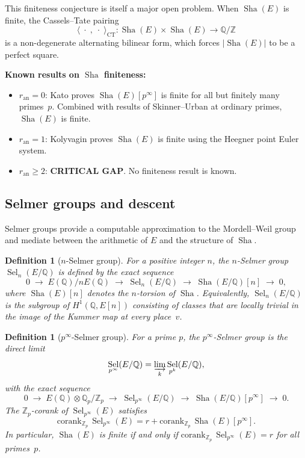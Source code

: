 \documentclass[11pt]{article}
\newtheorem{definition}[theorem]{Definition}
\DeclareMathOperator{\Sha}{Sha}
\DeclareMathOperator{\Sel}{Sel}
\begin{document}
\noindent
This finiteness conjecture is itself a major open problem.  When $\Sha(E)$ is
finite, the Cassels--Tate pairing \cite{Cassels}
\[
  \langle\;\cdot\;,\;\cdot\;\rangle_{\mathrm{CT}} :
  \Sha(E) \times \Sha(E) \longrightarrow \mathbb{Q}/\mathbb{Z}
\]
is a non-degenerate alternating bilinear form, which forces $|\Sha(E)|$ to be
a perfect square.

\textbf{Known results on $\Sha$ finiteness:}
\begin{itemize}
  \item $r_{\mathrm{an}} = 0$: Kato \cite{Kato} proves $\Sha(E)[p^\infty]$ is
    finite for all but finitely many primes~$p$.  Combined with results of
    Skinner--Urban \cite{SU} at ordinary primes, $\Sha(E)$ is finite.
  \item $r_{\mathrm{an}} = 1$: Kolyvagin \cite{Koly} proves $\Sha(E)$ is
    finite using the Heegner point Euler system.
  \item $r_{\mathrm{an}} \geq 2$: \textbf{CRITICAL GAP}.  No finiteness
    result is known.
\end{itemize}

\subsection{Selmer groups and descent}
\label{subsec:selmer}

Selmer groups provide a computable approximation to the Mordell--Weil group and
mediate between the arithmetic of $E$ and the structure of $\Sha$.

\begin{definition}[$n$-Selmer group]
For a positive integer $n$, the \emph{$n$-Selmer group} $\Sel_n(E/\mathbb{Q})$
is defined by the exact sequence
\[
  0 \;\longrightarrow\; E(\mathbb{Q})/nE(\mathbb{Q})
  \;\longrightarrow\; \Sel_n(E/\mathbb{Q})
  \;\longrightarrow\; \Sha(E/\mathbb{Q})[n]
  \;\longrightarrow\; 0,
\]
where $\Sha(E)[n]$ denotes the $n$-torsion of $\Sha$.  Equivalently,
$\Sel_n(E/\mathbb{Q})$ is the subgroup of $H^1(\mathbb{Q}, E[n])$ consisting
of classes that are locally trivial in the image of the Kummer map at every
place~$v$.
\end{definition}

\begin{definition}[$p^\infty$-Selmer group]
For a prime $p$, the \emph{$p^\infty$-Selmer group} is the direct limit
\[
  \Sel_{p^\infty}(E/\mathbb{Q}) = \varinjlim_k \Sel_{p^k}(E/\mathbb{Q}),
\]
with the exact sequence
\[
  0 \;\longrightarrow\; E(\mathbb{Q}) \otimes \mathbb{Q}_p/\mathbb{Z}_p
  \;\longrightarrow\; \Sel_{p^\infty}(E/\mathbb{Q})
  \;\longrightarrow\; \Sha(E/\mathbb{Q})[p^\infty]
  \;\longrightarrow\; 0.
\]
The $\mathbb{Z}_p$-corank of $\Sel_{p^\infty}(E)$ satisfies
\[
  \mathrm{corank}_{\mathbb{Z}_p}\, \Sel_{p^\infty}(E) = r + \mathrm{corank}_{\mathbb{Z}_p}\, \Sha(E)[p^\infty].
\]
In particular, $\Sha(E)$ is finite if and only if
$\mathrm{corank}_{\mathbb{Z}_p}\, \Sel_{p^\infty}(E) = r$ for all primes~$p$.
\end{definition}
\end{document}
